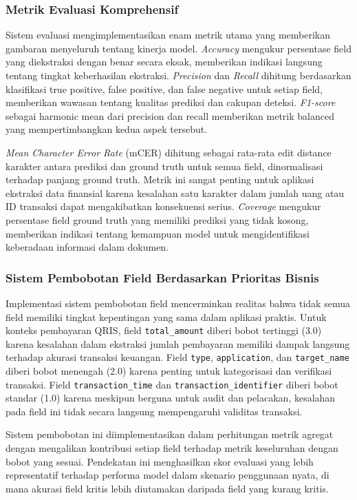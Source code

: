 \subsubsection{Metrik Evaluasi Komprehensif}

Sistem evaluasi mengimplementasikan enam metrik utama yang memberikan gambaran menyeluruh tentang kinerja model. \textit{Accuracy} mengukur persentase field yang diekstraksi dengan benar secara eksak, memberikan indikasi langsung tentang tingkat keberhasilan ekstraksi. \textit{Precision} dan \textit{Recall} dihitung berdasarkan klasifikasi true positive, false positive, dan false negative untuk setiap field, memberikan wawasan tentang kualitas prediksi dan cakupan deteksi. \textit{F1-score} sebagai harmonic mean dari precision dan recall memberikan metrik balanced yang mempertimbangkan kedua aspek tersebut.

\textit{Mean Character Error Rate} (mCER) dihitung sebagai rata-rata edit distance karakter antara prediksi dan ground truth untuk semua field, dinormalisasi terhadap panjang ground truth. Metrik ini sangat penting untuk aplikasi ekstraksi data finansial karena kesalahan satu karakter dalam jumlah uang atau ID transaksi dapat mengakibatkan konsekuensi serius. \textit{Coverage} mengukur persentase field ground truth yang memiliki prediksi yang tidak kosong, memberikan indikasi tentang kemampuan model untuk mengidentifikasi keberadaan informasi dalam dokumen.

\subsubsection{Sistem Pembobotan Field Berdasarkan Prioritas Bisnis}

Implementasi sistem pembobotan field mencerminkan realitas bahwa tidak semua field memiliki tingkat kepentingan yang sama dalam aplikasi praktis. Untuk konteks pembayaran QRIS, field \texttt{total\_amount} diberi bobot tertinggi (3.0) karena kesalahan dalam ekstraksi jumlah pembayaran memiliki dampak langsung terhadap akurasi transaksi keuangan. Field \texttt{type}, \texttt{application}, dan \texttt{target\_name} diberi bobot menengah (2.0) karena penting untuk kategorisasi dan verifikasi transaksi. Field \texttt{transaction\_time} dan \texttt{transaction\_identifier} diberi bobot standar (1.0) karena meskipun berguna untuk audit dan pelacakan, kesalahan pada field ini tidak secara langsung mempengaruhi validitas transaksi.

Sistem pembobotan ini diimplementasikan dalam perhitungan metrik agregat dengan mengalikan kontribusi setiap field terhadap metrik keseluruhan dengan bobot yang sesuai. Pendekatan ini menghasilkan skor evaluasi yang lebih representatif terhadap performa model dalam skenario penggunaan nyata, di mana akurasi field kritis lebih diutamakan daripada field yang kurang kritis.
